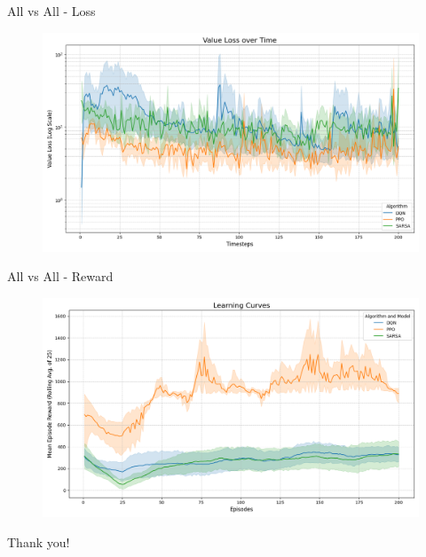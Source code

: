 \documentclass[serif]{beamer}  %
\begin{document}
\begin{frame}{All vs All - Loss}
    \begin{figure}
        \centering
        \includegraphics[width=\linewidth]{plots/all_value_loss_curve.png}
    \end{figure}
\end{frame}

\begin{frame}{All vs All - Reward}
    \begin{figure}
        \centering
        \includegraphics[width=\linewidth]{plots/all_reward_curve.png}
    \end{figure}
\end{frame}


\begin{frame}
\centering
{\Huge Thank you!}
\end{frame}



\end{document}
